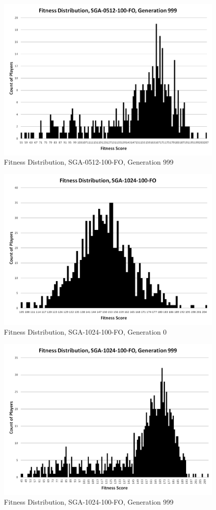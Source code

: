 \begin{figure}[htp]
\centerline{\includegraphics[width=0.75\columnwidth]{Figures/SGA_0512_100_FO_gen999.png}}
\caption{Fitness Distribution, SGA-0512-100-FO, Generation 999}
\end{figure}

\begin{figure}[htp]
\centerline{\includegraphics[width=0.75\columnwidth]{Figures/SGA_1024_100_FO_gen0.png}}
\caption{Fitness Distribution, SGA-1024-100-FO, Generation 0}
\end{figure}

\begin{figure}[htp]
\centerline{\includegraphics[width=0.75\columnwidth]{Figures/SGA_1024_100_FO_gen999.png}}
\caption{Fitness Distribution, SGA-1024-100-FO, Generation 999}
\end{figure}
